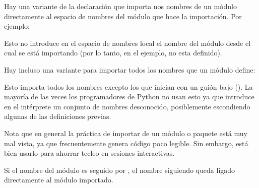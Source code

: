 \documentclass[a5paper,10pt,spanish]{sphinxmanual}
\begin{document}
\sphinxAtStartPar
Hay una variante de la declaración  que importa nos nombres de un módulo directamente al espacio de nombres del módulo que hace la importación. Por ejemplo:

\begin{sphinxVerbatim}[commandchars=\\\{\}]
    
\end{sphinxVerbatim}

\sphinxAtStartPar
Esto no introduce en el espacio de nombres local el nombre del módulo desde el cual se está importando (por lo tanto, en el ejemplo,  no esta definido).

\sphinxAtStartPar
Hay incluso una variante para importar todos los nombres que un módulo define:

\begin{sphinxVerbatim}[commandchars=\\\{\}]
   
\end{sphinxVerbatim}

\sphinxAtStartPar
Esto importa todos los nombres excepto los que inician con un guión bajo (\sphinxcode{\sphinxupquote{\_}}). La mayoría de las veces los programadores de Python no usan esto ya que introduce en el intérprete un conjunto de nombres desconocido, posiblemente escondiendo algunas de las definiciones previas.

\sphinxAtStartPar
Nota que en general la práctica de importar \sphinxcode{\sphinxupquote{*}} de un módulo o paquete está muy mal vista, ya que frecuentemente genera código poco legible. Sin embargo, está bien usarlo para ahorrar tecleo en sesiones interactivas.

\sphinxAtStartPar
Si el nombre del módulo es seguido por , el nombre siguiendo  queda ligado directamente al módulo importado.

\begin{sphinxVerbatim}[commandchars=\\\{\}]
   
\end{sphinxVerbatim}
\end{document}
